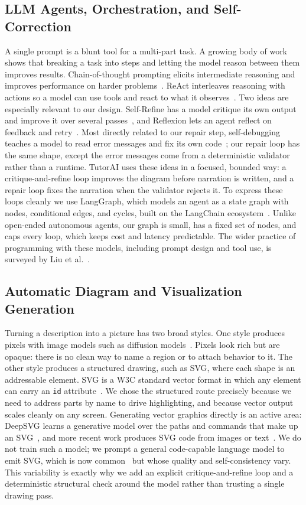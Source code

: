 \documentclass[conference]{IEEEtran}
\begin{document}
\subsection{LLM Agents, Orchestration, and Self-Correction}
A single prompt is a blunt tool for a multi-part task. A growing body of work
shows that breaking a task into steps and letting the model reason between them
improves results. Chain-of-thought prompting elicits intermediate reasoning and
improves performance on harder problems~\cite{wei2022cot}. ReAct interleaves
reasoning with actions so a model can use tools and react to what it
observes~\cite{yao2023react}. Two ideas are especially relevant to our design.
Self-Refine has a model critique its own output and improve it over several
passes~\cite{madaan2023selfrefine}, and Reflexion lets an agent reflect on
feedback and retry~\cite{shinn2023reflexion}. Most directly related to our repair
step, self-debugging teaches a model to read error messages and fix its own
code~\cite{chen2023selfdebug}; our repair loop has the same shape, except the
error messages come from a deterministic validator rather than a runtime. TutorAI
uses these ideas in a focused, bounded way: a critique-and-refine loop improves
the diagram before narration is written, and a repair loop fixes the narration
when the validator rejects it. To express these loops cleanly we use LangGraph, which models an
agent as a state graph with nodes, conditional edges, and cycles, built on the
LangChain ecosystem~\cite{langgraph,langchain}. Unlike open-ended autonomous
agents, our graph is small, has a fixed set of nodes, and caps every loop, which
keeps cost and latency predictable. The wider practice of programming with these
models, including prompt design and tool use, is surveyed by Liu et
al.~\cite{liu2023promptsurvey}.

\subsection{Automatic Diagram and Visualization Generation}
Turning a description into a picture has two broad styles. One style produces
pixels with image models such as diffusion models~\cite{rombach2022stable}.
Pixels look rich but are opaque: there is no clean way to name a region or to
attach behavior to it. The other style produces a structured drawing, such as
SVG, where each shape is an addressable element. SVG is a W3C standard
vector format in which any element can carry an \texttt{id}
attribute~\cite{svgspec}. We chose the structured route precisely because we
need to address parts by name to drive highlighting, and because vector output
scales cleanly on any screen. Generating vector graphics directly is an active
area: DeepSVG learns a generative model over the paths and commands that make up
an SVG~\cite{carlier2020deepsvg}, and more recent work produces SVG code from
images or text~\cite{rodriguez2023starvector}. We do not train such a model; we
prompt a general code-capable language model to emit SVG, which is now
common~\cite{chen2021codex} but whose quality and self-consistency vary. This variability is exactly why we
add an explicit critique-and-refine loop and a deterministic structural check
around the model rather than trusting a single drawing pass.
\end{document}
